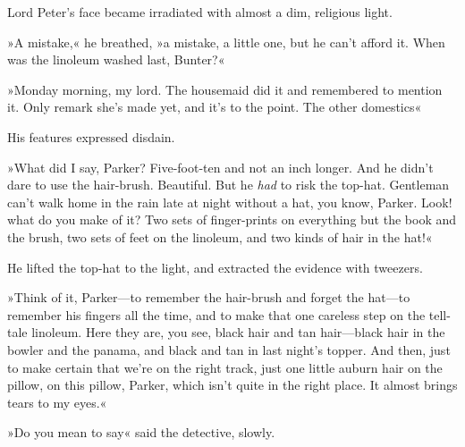 Lord Peter's face became irradiated with almost a dim, religious light.

»A mistake,« he breathed, »a mistake, a little one, but he can't afford it. When was the linoleum washed last, Bunter?«

»Monday morning, my lord. The housemaid did it and remembered to mention it. Only remark she's made yet, and it's to the point. The other domestics\longdash«

His features expressed disdain.

»What did I say, Parker? Five-foot-ten and not an inch longer. And he didn't dare to use the hair-brush. Beautiful. But he \textit{had} to risk the top-hat. Gentleman can't walk home in the rain late at night without a hat, you know, Parker. Look! what do you make of it? Two sets of finger-prints on everything but the book and the brush, two sets of feet on the linoleum, and two kinds of hair in the hat!«

He lifted the top-hat to the light, and extracted the evidence with tweezers.

»Think of it, Parker—to remember the hair-brush and forget the hat—to remember his fingers all the time, and to make that one careless step on the tell-tale linoleum. Here they are, you see, black hair and tan hair—black hair in the bowler and the panama, and black and tan in last night's topper. And then, just to make certain that we're on the right track, just one little auburn hair on the pillow, on this pillow, Parker, which isn't quite in the right place. It almost brings tears to my eyes.«

»Do you mean to say\longdash« said the detective, slowly.

